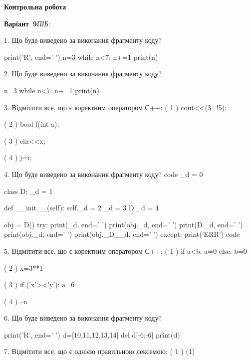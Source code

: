 \documentclass[11pt]{article}
\begin{document}
{\large\textbf{Контрольна робота}}

\textbf{Варіант \No\,9}\hfill \textit{ПІБ:}\,\underline{\hspace{60mm}}
\vspace{4mm}

1. Що буде виведено за виконання фрагменту коду?

print('R', end=' ')
n=3
while n<7:
    n+=1
print(n)

\vspace{5mm}

2. Що буде виведено за виконання фрагменту коду?

n=3
while n<7:
    n+=1
print(n)

\vspace{5mm}

3. %
Відмітити все, що є коректним оператором С++:
( 1 ) cout<<(3=!5);

( 2 ) bool f(int a);

( 3 ) cin<<x;

( 4 ) j=i;
\vspace{5mm}

4. Що буде виведено за виконання фрагменту коду?
code
_d = 0

class D:
    _d = 1
    
    def __init__(self):
        self._d = 2
        _d = 3
        D._d = 4

obj = D()
try:
    print(_d, end=' ')
    print(obj._d, end=' ')
    print(D._d, end=' ')
    print(obj._d, end=' ')
    print(obj._D__d, end=' ')
except:
    print('ERR')
code
\vspace{5mm}

5. %
Відмітити все, що є коректним оператором С++:
( 1 ) if a<b: a=0 else: b=0

( 2 ) x=3**1

( 3 ) if ('x'><'y'): a=6

( 4 ) --n
\vspace{5mm}

6. Що буде виведено за виконання фрагменту коду?

print('R', end=' ')
d=[10,11,12,13,14]
del d[-6:-6]
print(d)

\vspace{5mm}

7. %
Відмітити все, що є однією правильною лексемою:
( 1 ) (1)
\end{document}
